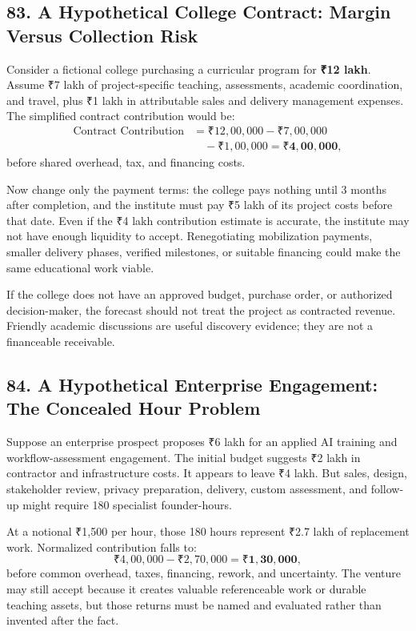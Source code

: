 \subsection*{83. A Hypothetical College Contract: Margin Versus Collection Risk}

Consider a fictional college purchasing a curricular program for \textbf{₹12 lakh}. Assume ₹7 lakh of project-specific teaching, assessments, academic coordination, and travel, plus ₹1 lakh in attributable sales and delivery management expenses. The simplified contract contribution would be:
\begin{equation}
\begin{aligned}
\text{Contract Contribution} &= ₹12,00,000 - ₹7,00,000 \\
&\quad - ₹1,00,000 = \mathbf{₹4,00,000},
\end{aligned}
\end{equation}
before shared overhead, tax, and financing costs.

Now change only the payment terms: the college pays nothing until 3 months after completion, and the institute must pay ₹5 lakh of its project costs before that date. Even if the ₹4 lakh contribution estimate is accurate, the institute may not have enough liquidity to accept. Renegotiating mobilization payments, smaller delivery phases, verified milestones, or suitable financing could make the same educational work viable.

If the college does not have an approved budget, purchase order, or authorized decision-maker, the forecast should not treat the project as contracted revenue. Friendly academic discussions are useful discovery evidence; they are not a financeable receivable.

\subsection*{84. A Hypothetical Enterprise Engagement: The Concealed Hour Problem}

Suppose an enterprise prospect proposes ₹6 lakh for an applied AI training and workflow-assessment engagement. The initial budget suggests ₹2 lakh in contractor and infrastructure costs. It appears to leave ₹4 lakh. But sales, design, stakeholder review, privacy preparation, delivery, custom assessment, and follow-up might require 180 specialist founder-hours.

At a notional ₹1,500 per hour, those 180 hours represent ₹2.7 lakh of replacement work. Normalized contribution falls to:
\begin{equation}
₹4,00,000 - ₹2,70,000 = \mathbf{₹1,30,000},
\end{equation}
before common overhead, taxes, financing, rework, and uncertainty. The venture may still accept because it creates valuable referenceable work or durable teaching assets, but those returns must be named and evaluated rather than invented after the fact.

